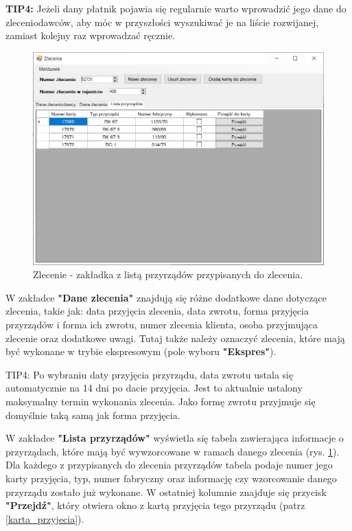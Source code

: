 \textbf{TIP4:} Jeżeli dany płatnik pojawia się regularnie warto wprowadzić jego dane do zleceniodawców, aby móc w przyszłości wyszukiwać je na liście rozwijanej, zamiast kolejny raz wprowadzać ręcznie.

\begin{figure}[htb]
	\centering
	\includegraphics[width=\columnwidth]{obrazki/Biuro/zlecenie/zlecenie_lista.png}
	\caption{Zlecenie - zakładka z listą przyrządów przypisanych do zlecenia.}
	\label{zlecenieLista}
\end{figure}

W zakładce \textbf{"Dane zlecenia"} znajdują się różne dodatkowe dane dotyczące zlecenia, takie jak: data przyjęcia zlecenia, data zwrotu, forma przyjęcia przyrządów i forma ich zwrotu, numer zlecenia klienta, osoba przyjmująca zlecenie oraz dodatkowe uwagi. Tutaj także należy oznaczyć zlecenia, które mają być wykonane w trybie ekspresowym (pole wyboru \textbf{"Ekspres"}). 

TIP4: Po wybraniu daty przyjęcia przyrządu, data zwrotu ustala się automatycznie na 14 dni po dacie przyjęcia. Jest to aktualnie ustalony maksymalny termin wykonania zlecenia. Jako formę zwrotu przyjmuje się domyślnie taką samą jak forma przyjęcia.

W zakładce \textbf{"Lista przyrządów"} wyświetla się tabela zawierająca informacje o przyrządach, które mają być wywzorcowane w ramach danego zlecenia (rys. \ref{zlecenieLista}). Dla każdego z przypisanych do zlecenia przyrządów tabela podaje numer jego karty przyjęcia, typ, numer fabryczny oraz informację czy wzorcowanie danego przyrządu zostało już wykonane. W ostatniej kolumnie znajduje się przycisk \textbf{"Przejdź"}, który otwiera okno z kartą przyjęcia tego przyrządu (patrz \ref{karta_przyjecia}).

